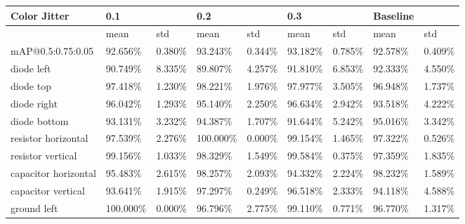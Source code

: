 
\begin{table}[H]
\scriptsize %
\begin{center}
\begin{tabular}{|l|l|l|l|l|l|l|l|l|}
\hline
Color Jitter                    & 0.1      &          & \cellcolor{green}0.2      &          & 0.3      &          & Baseline &              \\
\hline
                                & mean     & std      & mean     & std      & mean     & std      & mean     & std          \\
\hline
mAP@0.5:0.75:0.05               & 92.656\%  & 0.380\% & \cellcolor{green}93.243\%  & 0.344\% & 93.182\% & 0.785\%  & 92.578\%  & 0.409\%   \\
\hline
\rowcolor{lightgray!50}
diode left                      & 90.749\%  & 8.335\% & 89.807\%  & 4.257\% & 91.810\% & 6.853\%  & 92.333\%  & 4.550\%   \\
diode top                       & 97.418\%  & 1.230\% & 98.221\%  & 1.976\% & 97.977\% & 3.505\%  & 96.948\%  & 1.737\%   \\
\rowcolor{lightgray!50}
diode right                     & 96.042\%  & 1.293\% & 95.140\%  & 2.250\% & 96.634\% & 2.942\%  & 93.518\%  & 4.222\%   \\
diode bottom                    & 93.131\%  & 3.232\% & 94.387\%  & 1.707\% & 91.644\% & 5.242\%  & 95.016\%  & 3.342\%   \\
\rowcolor{lightgray!50}
resistor horizontal             & 97.539\%  & 2.276\% & 100.000\% & 0.000\% & 99.154\% & 1.465\%  & 97.322\%  & 0.526\%   \\
resistor vertical               & 99.156\%  & 1.033\% & 98.329\%  & 1.549\% & 99.584\% & 0.375\%  & 97.359\%  & 1.835\%   \\
\rowcolor{lightgray!50}
capacitor horizontal            & 95.483\%  & 2.615\% & 98.257\%  & 2.093\% & 94.332\% & 2.224\%  & 98.232\%  & 1.589\%   \\
capacitor vertical              & 93.641\%  & 1.915\% & 97.297\%  & 0.249\% & 96.518\% & 2.333\%  & 94.118\%  & 4.588\%   \\
\rowcolor{lightgray!50}
ground left                     & 100.000\% & 0.000\% & 96.796\%  & 2.775\% & 99.110\% & 0.771\%  & 96.770\%  & 1.317\%   \\

\end{tabular}
\end{center}
\end{table}
